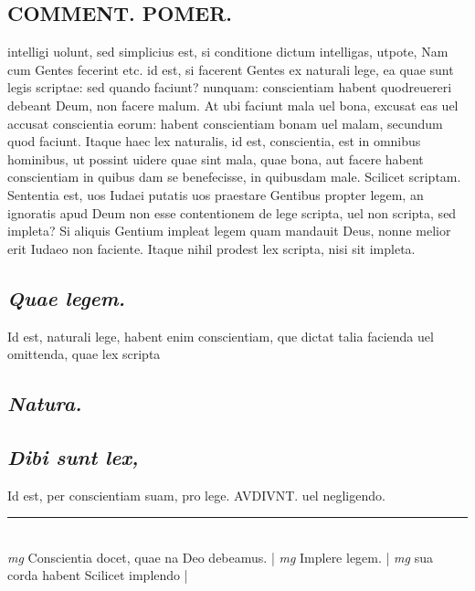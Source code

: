 \documentclass{article}
\begin{document}
\begin{pages}
\section*{COMMENT. POMER.  }\pstart intelligi uolunt, sed simplicius est, si conditione dictum intelligas, utpote, Nam cum Gentes fecerint etc. id est, si facerent Gentes ex naturali lege, ea quae sunt legis scriptae: sed quando faciunt? nunquam: conscientiam habent quodreuereri debeant Deum, non facere malum. At ubi faciunt mala uel bona, excusat eas uel accusat conscientia eorum: habent conscientiam bonam uel malam, secundum quod faciunt.  Itaque haec lex naturalis, id est, conscientia, est in omnibus hominibus, ut possint uidere quae sint mala, quae bona, aut facere habent conscientiam in quibus dam se benefecisse, in quibusdam male.  \pend\pstart Scilicet scriptam. Sententia est, uos Iudaei putatis uos praestare Gentibus propter legem, an ignoratis apud Deum non esse contentionem de lege scripta, uel non scripta, sed impleta? Si aliquis Gentium impleat legem quam mandauit Deus, nonne melior erit Iudaeo non faciente. Itaque nihil prodest lex scripta, nisi sit impleta.   \pend
{}
{}
\subsection*{\textit{Quae legem. }}\pstart Id est, naturali lege, habent enim conscientiam, que dictat talia facienda uel omittenda, quae lex scripta\pend
{}
{}
\subsection*{\textit{Natura. }}
{}
\subsection*{\textit{Dibi sunt lex, }}\pstart Id est, per conscientiam suam, pro lege. AVDIVNT.  uel negligendo.  \pend
\vspace{0.5cm}\noindent
\vspace{0.2cm}\rule{1cm}{0.2pt}\\ 
\hspace{0.2cm}\textit{mg}
\footnotesize Conscientia docet, quae na Deo debeamus. 
\normalsize| 
\hspace{0.2cm}\textit{mg}
\footnotesize Implere legem.  
\normalsize| 
\hspace{0.2cm}\textit{mg}
\footnotesize sua corda habent Scilicet implendo 
\normalsize| 

\end{pages}
\end{document}
